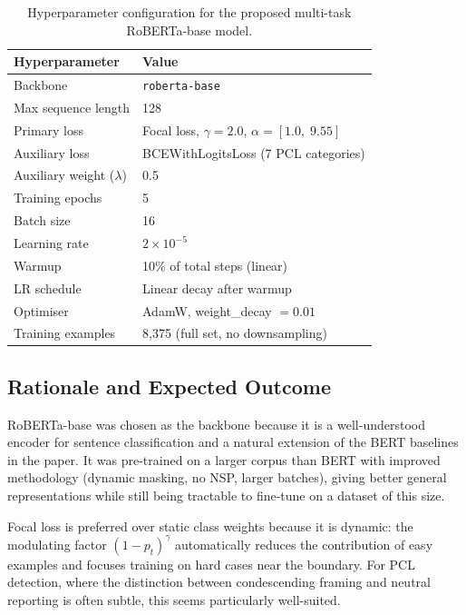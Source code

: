 \documentclass{article}
\begin{document}
\begin{table}[ht]
    \centering
    \begin{tabular}{ll}
        \toprule
        \textbf{Hyperparameter} & \textbf{Value} \\
        \midrule
        Backbone           & \texttt{roberta-base} \\
        Max sequence length & 128 \\
        Primary loss       & Focal loss, $\gamma = 2.0$, $\alpha = [1.0,\; 9.55]$ \\
        Auxiliary loss     & BCEWithLogitsLoss (7 PCL categories) \\
        Auxiliary weight ($\lambda$) & 0.5 \\
        Training epochs    & 5 \\
        Batch size         & 16 \\
        Learning rate      & $2 \times 10^{-5}$ \\
        Warmup             & 10\% of total steps (linear) \\
        LR schedule        & Linear decay after warmup \\
        Optimiser          & AdamW, weight\_decay $= 0.01$ \\
        Training examples  & 8,375 (full set, no downsampling) \\
        \bottomrule
    \end{tabular}
    \caption{Hyperparameter configuration for the proposed multi-task RoBERTa-base model.}
    \label{tab:hyperparams}
\end{table}

\subsection*{Rationale and Expected Outcome}

RoBERTa-base was chosen as the backbone because it is a well-understood encoder for sentence classification and a natural extension of the BERT baselines in the paper. It was pre-trained on a larger corpus than BERT with improved methodology (dynamic masking, no NSP, larger batches), giving better general representations while still being tractable to fine-tune on a dataset of this size.

Focal loss is preferred over static class weights because it is dynamic: the modulating factor $(1 - p_t)^\gamma$ automatically reduces the contribution of easy examples and focuses training on hard cases near the boundary. For PCL detection, where the distinction between condescending framing and neutral reporting is often subtle, this seems particularly well-suited.
\end{document}
